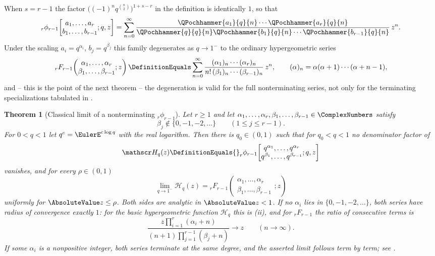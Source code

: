 \documentclass[11pt,a4paper,oneside,openany]{book}
\newtheorem{theorem}{Theorem}[chapter]
\theoremstyle{definition}
\theoremstyle{remark}
\begin{document}

When $s=r-1$ the factor $\bigl((-1)^nq^{\binom n2}\bigr)^{1+s-r}$ in the definition is identically $1$, so that
\[
 {}_r\phi_{r-1}\!\left[
 \begin{matrix}a_1,\dots,a_r\\ b_1,\dots,b_{r-1}\end{matrix};q,z\right]
 =\sum_{n=0}^{\infty}
 \frac{\QPochhammer{a_1}{q}{n}\cdots\QPochhammer{a_r}{q}{n}}
      {\QPochhammer{q}{q}{n}\QPochhammer{b_1}{q}{n}\cdots\QPochhammer{b_{r-1}}{q}{n}}\,z^n .
\]
Under the scaling $a_i=q^{\alpha_i}$, $b_j=q^{\beta_j}$ this family degenerates as $q\to1^-$ to the ordinary hypergeometric series
\[
 {}_rF_{r-1}\!\left(
 \begin{matrix}\alpha_1,\dots,\alpha_r\\ \beta_1,\dots,\beta_{r-1}\end{matrix};z\right)
 \DefinitionEquals\sum_{n=0}^{\infty}
 \frac{(\alpha_1)_n\cdots(\alpha_r)_n}
      {n!\,(\beta_1)_n\cdots(\beta_{r-1})_n}\,z^n,
 \qquad
 (\alpha)_n=\alpha(\alpha+1)\cdots(\alpha+n-1),
\]
and -- this is the point of the next theorem -- the degeneration is valid for the full nonterminating series, not only for the terminating specializations tabulated in .

\begin{theorem}[Classical limit of a nonterminating ${}_r\phi_{r-1}$]\label{thm:classical-hypergeometric-limit}
Let $r\ge1$ and let $\alpha_1,\dots,\alpha_r,\beta_1,\dots,\beta_{r-1}\in\ComplexNumbers$ satisfy
\[
 \beta_j\notin\{0,-1,-2,\dots\}\qquad(1\le j\le r-1).
\]
For $0<q<1$ let $q^{c}=\EulerE^{c\log q}$ with the real logarithm.  Then there is $q_0\in(0,1)$ such that for $q_0<q<1$ no denominator factor of
\[
 \mathscr H_q(z)\DefinitionEquals
 {}_r\phi_{r-1}\!\left[
 \begin{matrix}q^{\alpha_1},\dots,q^{\alpha_r}\\
               q^{\beta_1},\dots,q^{\beta_{r-1}}\end{matrix};q,z\right]
\]
vanishes, and for every $\rho\in(0,1)$
\[
 \lim_{q\to1^-}\mathscr H_q(z)
 ={}_rF_{r-1}\!\left(
 \begin{matrix}\alpha_1,\dots,\alpha_r\\ \beta_1,\dots,\beta_{r-1}\end{matrix};z\right)
\]
uniformly for $\AbsoluteValue z\le\rho$.  Both sides are analytic in $\AbsoluteValue z<1$.  If no $\alpha_i$ lies in $\{0,-1,-2,\dots\}$, both series have radius of convergence exactly $1$: for the basic hypergeometric function $\mathscr H_q$ this is (ii), and for ${}_rF_{r-1}$ the ratio of consecutive terms is
\[
 \frac{z\prod_{i=1}^{r}(\alpha_i+n)}{(n+1)\prod_{j=1}^{r-1}(\beta_j+n)}\longrightarrow z
 \qquad(n\to\infty).
\]
If some $\alpha_i$ is a nonpositive integer, both series terminate at the same
degree, and the asserted limit follows term by term; see
.
\end{theorem}
\end{document}
